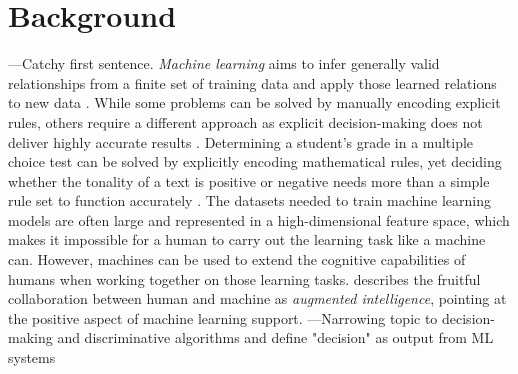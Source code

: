\section{Background}
{\color{red}---Catchy first sentence.}\newline
\textit{Machine learning} aims to infer generally valid relationships from a finite set of training data and apply those learned relations to new data \cite{domingos2012few, kotsiantis2007supervised}. While some problems can be solved by manually encoding explicit rules, others require a different approach as explicit decision-making does not deliver highly accurate results \cite{burrell2016machine}. Determining a student's grade in a multiple choice test can be solved by explicitly encoding mathematical rules, yet deciding whether the tonality of a text is positive or negative needs more than a simple rule set to function accurately \cite{melville2009sentiment}. The datasets needed to train machine learning models are often large and represented in a high-dimensional feature space, which makes it impossible for a human to carry out the learning task like a machine can. However, machines can be used to extend the cognitive capabilities of humans when working together on those learning tasks. \cite{ventocilla2018taxonomy} describes the fruitful collaboration between human and machine as \textit{augmented intelligence}, pointing at the positive aspect of machine learning support.\newline
{\color{red}---Narrowing topic to decision-making and discriminative algorithms and define "decision" as output from ML systems}


